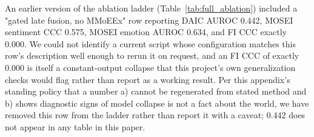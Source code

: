 \documentclass[letterpaper]{article}
\begin{document}
An earlier version of the ablation ladder (Table~\ref{tab:full_ablation}) included a "gated late fusion, no MMoEEx" row reporting DAIC AUROC 0.442, MOSEI sentiment CCC 0.575, MOSEI emotion AUROC 0.634, and FI CCC exactly 0.000. We could not identify a current script whose configuration matches this row's description well enough to rerun it on request, and an FI CCC of exactly 0.000 is itself a constant-output collapse that this project's own generalization checks would flag rather than report as a working result. Per this appendix's standing policy that a number a) cannot be regenerated from stated method and b) shows diagnostic signs of model collapse is not a fact about the world, we have removed this row from the ladder rather than report it with a caveat; 0.442 does not appear in any table in this paper.


\end{document}

